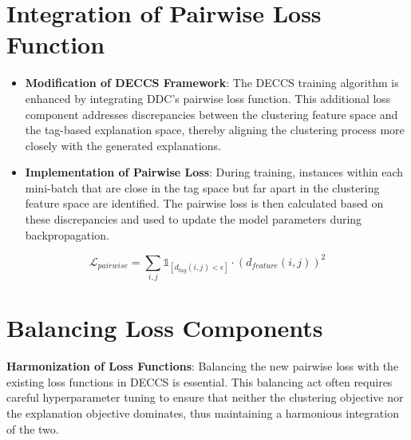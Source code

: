 \section{Integration of Pairwise Loss Function}
\begin{itemize}
    \item \textbf{Modification of DECCS Framework}: The DECCS training algorithm is enhanced by integrating DDC's pairwise loss function. This additional loss component addresses discrepancies between the clustering feature space and the tag-based explanation space, thereby aligning the clustering process more closely with the generated explanations.
    \item \textbf{Implementation of Pairwise Loss}: During training, instances within each mini-batch that are close in the tag space but far apart in the clustering feature space are identified. The pairwise loss is then calculated based on these discrepancies and used to update the model parameters during backpropagation.
\end{itemize}

\begin{equation}
\mathcal{L}_{pairwise} = \sum_{i,j} \mathds{1}_{[d_{tag}(i,j) < \epsilon]} \cdot \left( d_{feature}(i,j) \right)^2
\end{equation}

\section{Balancing Loss Components}
\textbf{Harmonization of Loss Functions}: Balancing the new pairwise loss with the existing loss functions in DECCS is essential. This balancing act often requires careful hyperparameter tuning to ensure that neither the clustering objective nor the explanation objective dominates, thus maintaining a harmonious integration of the two.

